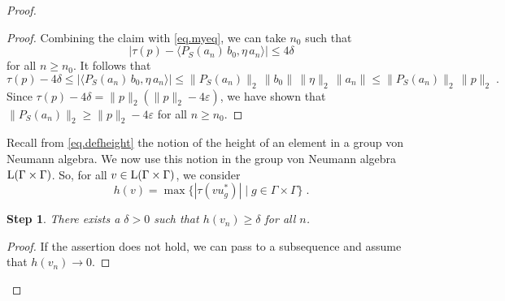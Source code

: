 \documentclass[a4paper,11pt]{amsart}
\numberwithin{equation}{section}
\newtheorem{step}{Step}[section]
\begin{document}
\begin{proof}
\begin{proof}
Combining the claim with \eqref{eq.myeq}, we can take $n_0$ such that
$$\big| \tau(p) - \langle P_S(a_n) \, b_0 , \eta \, a_n \rangle \big| {\leqslant} 4 \delta$$
for all $n {\geqslant} n_0$. It follows that
\begin{equation*}
\tau(p) - 4 \delta {\leqslant} |\langle P_S(a_n) \, b_0 , \eta \, a_n \rangle | {\leqslant} \|P_S(a_n)\|_2 \, \|b_0\| \, \|\eta\|_2 \, \|a_n\| {\leqslant} \|P_S(a_n)\|_2 \, \|p\|_2 \; .
\end{equation*}
Since $\tau(p) - 4 \delta = \|p\|_2 (\|p\|_2 - 4 {\varepsilon})$, we have shown that $\|P_S(a_n)\|_2 {\geqslant} \|p\|_2 - 4 {\varepsilon}$ for all $n {\geqslant} n_0$.
\end{proof}

Recall from \eqref{eq.defheight} the notion of the height of an element in a group von Neumann algebra. We now use this notion in the group von Neumann algebra ${\mathord{\text{\rm L}}}(\Gamma \times \Gamma)$. So, for all $v \in {\mathord{\text{\rm L}}}(\Gamma \times \Gamma)$, we consider
$$h(v) = \max\{ |\tau(v u_g^*)| \mid g \in \Gamma \times \Gamma\} \; .$$

\begin{step}\label{stepe}
There exists a $\delta > 0$ such that $h(v_n) {\geqslant} \delta$ for all $n$.
\end{step}
\begin{proof}
If the assertion does not hold, we can pass to a subsequence and assume that $h(v_n) {\rightarrow} 0$.


\end{proof}
\end{proof}
\end{document}
